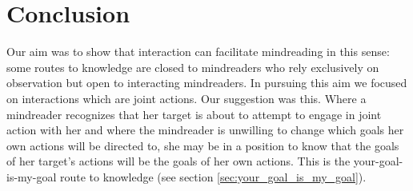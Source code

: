 \documentclass[12pt,\papersize]{extarticle}
\begin{document}




\section{Conclusion}
Our aim was to show that interaction can facilitate mindreading in this sense:
some routes to knowledge are closed to mindreaders who rely exclusively on observation
but
open to interacting mindreaders.
In pursuing this aim we focused on interactions which are joint actions.
Our suggestion was this.
Where a mindreader recognizes that her target is about to attempt to engage in joint action with her 
and where the mindreader is unwilling to change which goals her own actions will be directed to,
she may be in a position to know
that the goals of her target's actions will be the goals of her own actions.
This is the your-goal-is-my-goal route to  knowledge (see  section \vref{sec:your_goal_is_my_goal}).


\end{document}

